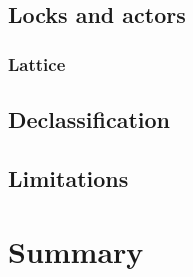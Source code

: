 \subsection{Locks and actors}

\subsubsection{Lattice}

\subsection{Declassification}


\subsection{Limitations}

\section{Summary}
